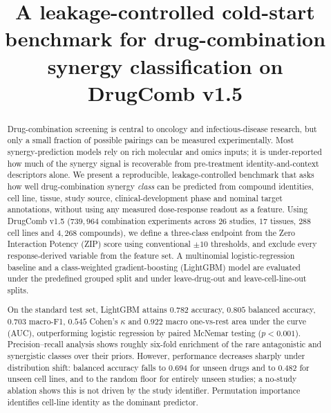 \documentclass{bmcart}
\begin{document}
\begin{frontmatter}

\begin{fmbox}

\title{A leakage-controlled cold-start benchmark for drug-combination synergy classification on DrugComb v1.5}

\author[
   addressref={aff1},
   corref={aff1},
   email={xxp5066@psu.edu}
]{ }

\address[id=aff1]{%
  ,
  ,
}

\end{fmbox}%

\begin{abstractbox}

\begin{abstract}
Drug-combination screening is central to oncology and infectious-disease research, but only a small
fraction of possible pairings can be measured experimentally. Most synergy-prediction models rely on
rich molecular and omics inputs; it is under-reported how much of the synergy signal is recoverable
from pre-treatment identity-and-context descriptors alone. We present a reproducible, leakage-controlled
benchmark that asks how well drug-combination synergy \emph{class} can be predicted from compound
identities, cell line, tissue, study source, clinical-development phase and nominal target annotations,
without using any measured dose-response readout as a feature. Using DrugComb v1.5 ($739{,}964$
combination experiments across $26$ studies, $17$ tissues, $288$ cell lines and $4{,}268$ compounds),
we define a three-class endpoint from the Zero Interaction Potency (ZIP) score using conventional
$\pm 10$ thresholds, and exclude every response-derived variable from the feature set. A multinomial
logistic-regression baseline and a class-weighted gradient-boosting (LightGBM) model are evaluated under
the predefined grouped split and under leave-drug-out and leave-cell-line-out splits.

On the standard test set, LightGBM attains $0.782$ accuracy, $0.805$ balanced accuracy, $0.703$
macro-F1, $0.545$ Cohen's $\kappa$ and $0.922$ macro one-vs-rest area under the curve (AUC),
outperforming logistic regression by paired McNemar testing ($p<0.001$). Precision--recall analysis
shows roughly six-fold enrichment of the rare antagonistic and synergistic classes over their priors.
However, performance decreases sharply under distribution shift: balanced accuracy falls to $0.694$ for
unseen drugs and to $0.482$ for unseen cell lines, and to the random floor for entirely unseen studies;
a no-study ablation shows this is not driven by the study identifier. Permutation importance identifies
cell-line identity as the dominant predictor.


\end{abstract}
\end{abstractbox}
\end{frontmatter}
\end{document}

